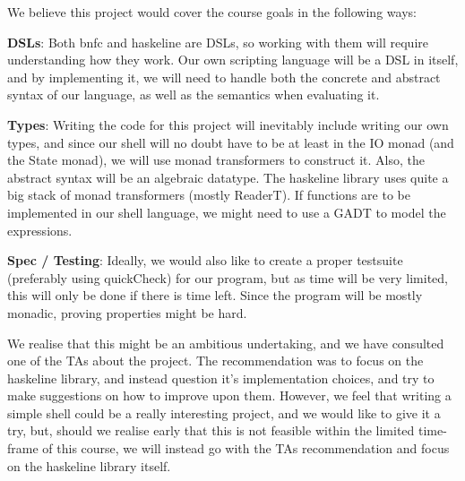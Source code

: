 \documentclass[11pt,a4paper]{article}
\begin{document}
We believe this project would cover the course goals in the following ways:

\textbf{DSLs}: Both bnfc and haskeline are DSLs, so working with them will require
understanding how they work. Our own scripting language will be a DSL in itself,
and by implementing it, we will need to handle both the concrete and abstract
syntax of our language, as well as the semantics when evaluating it.

\textbf{Types}: Writing the code for this project will inevitably include writing our own
types, and since our shell will no doubt have to be at least in the IO monad
(and the State monad), we will use monad transformers to construct it. Also, the
abstract syntax will be an algebraic datatype.  The haskeline library uses quite
a big stack of monad transformers (mostly ReaderT). If functions are to be
implemented in our shell language, we might need to use a GADT to model the
expressions.

\textbf{Spec / Testing}: Ideally, we would also like to create  a proper testsuite
(preferably using quickCheck) for our program, but as time will be very limited,
this will only be done if there is time left. Since the program will be mostly
monadic, proving properties might be hard.

We realise that this might be an ambitious undertaking, and we have consulted
one of the TAs about the project. The recommendation was to focus on the
haskeline library, and instead question it’s implementation choices, and try to
make suggestions on how to improve upon them. However, we feel that writing a
simple shell could be a really interesting project, and we would like to give it
a try, but, should we realise early that this is not feasible within the limited
time-frame of this course, we will instead go with the TAs recommendation and
focus on the haskeline library itself.
\end{document}

